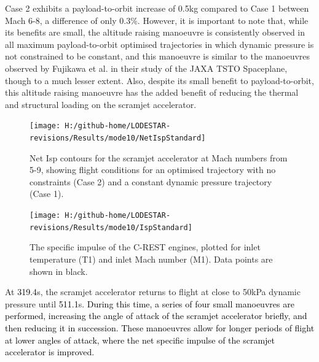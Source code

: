 Case 2 exhibits a payload-to-orbit increase of 0.5kg compared to Case 1 between Mach 6-8, a difference of only 0.3\%.
However, it is important to note that, while its benefits are small, the altitude raising manoeuvre is consistently observed in all maximum payload-to-orbit optimised trajectories in which dynamic pressure is not constrained to be constant, and this manoeuvre is similar to the manoeuvres observed by Fujikawa et al.\cite{Fujikawa2017} in their study of the JAXA TSTO Spaceplane, though to a much lesser extent. 
Also, despite its small benefit to payload-to-orbit, this altitude raising manoeuvre has the added benefit of reducing the thermal and structural loading on the scramjet accelerator. 





\begin{figure}[ht!]%
	\centering
	\texttt{[image: H:/github-home/LODESTAR-revisions/Results/mode10/NetIspStandard]}
	\caption{Net Isp contours for the scramjet accelerator at Mach numbers from 5-9, showing flight conditions for an optimised trajectory with no constraints (Case 2) and a constant dynamic pressure trajectory (Case 1). }
	\label{fig:NetIspStandardNoReturn}
\end{figure}

\begin{figure}[ht!]%
	\centering
	\texttt{[image: H:/github-home/LODESTAR-revisions/Results/mode10/IspStandard]}
	\caption{The specific impulse of the C-REST engines, plotted for inlet temperature (T1) and inlet Mach number (M1). Data points are shown in black. }
	\label{fig:IspStandard}
\end{figure}


At \textcolor{black}{319.4}s, the scramjet accelerator returns to flight at close to 50kPa dynamic pressure until \textcolor{black}{511.1}s. \textcolor{black}{During this time, a series of four small manoeuvres are performed, increasing the angle of attack of the scramjet accelerator briefly, and then reducing it in succession. These manoeuvres allow for longer periods of flight at lower angles of attack, where the net specific impulse of the scramjet accelerator is improved. }
 
